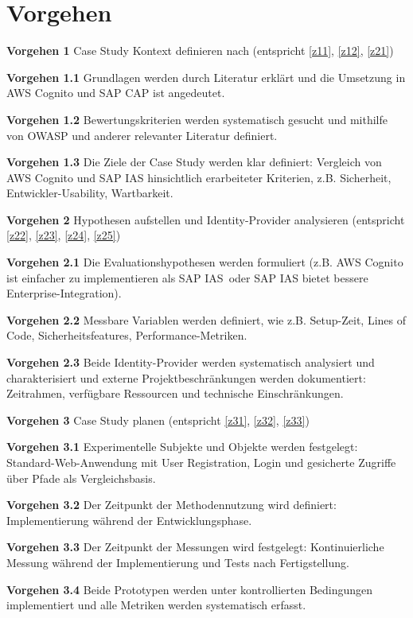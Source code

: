 \section{Vorgehen}

\begin{description}
    \item \textbf{Vorgehen 1} Case Study Kontext definieren nach \citep{Kitchenham1995} (entspricht \ref{z11}, \ref{z12}, \ref{z21})
        \item \textbf{Vorgehen 1.1} Grundlagen werden durch Literatur erklärt und die Umsetzung in AWS Cognito und \ac{SAP CAP} ist angedeutet.
        \item \textbf{Vorgehen 1.2} Bewertungskriterien werden systematisch gesucht und mithilfe von \ac{OWASP} und anderer relevanter Literatur definiert.
        \item \textbf{Vorgehen 1.3} Die Ziele der Case Study werden klar definiert: Vergleich von AWS Cognito und \ac{SAP IAS} hinsichtlich erarbeiteter Kriterien, z.B. Sicherheit, Entwickler-Usability, Wartbarkeit.
    
    \item \textbf{Vorgehen 2} Hypothesen aufstellen und Identity-Provider analysieren (entspricht \ref{z22}, \ref{z23}, \ref{z24}, \ref{z25})
        \item \textbf{Vorgehen 2.1} Die Evaluationshypothesen werden formuliert (z.B. \glqq AWS Cognito ist einfacher zu implementieren als SAP IAS\grqq\
         oder \glqq SAP IAS bietet bessere Enterprise-Integration\grqq).
        \item \textbf{Vorgehen 2.2} Messbare Variablen werden definiert, wie z.B. Setup-Zeit, Lines of Code, Sicherheitsfeatures, Performance-Metriken.
        \item \textbf{Vorgehen 2.3} Beide Identity-Provider werden systematisch analysiert und charakterisiert und externe Projektbeschränkungen werden dokumentiert: Zeitrahmen, verfügbare Ressourcen und technische Einschränkungen.
    
    \item \textbf{Vorgehen 3} Case Study planen (entspricht \ref{z31}, \ref{z32}, \ref{z33})
        \item \textbf{Vorgehen 3.1} Experimentelle Subjekte und Objekte werden festgelegt: Standard-Web-Anwendung mit User Registration, Login und gesicherte Zugriffe über Pfade als Vergleichsbasis.
        \item \textbf{Vorgehen 3.2} Der Zeitpunkt der Methodennutzung wird definiert: Implementierung während der Entwicklungsphase.
        \item \textbf{Vorgehen 3.3} Der Zeitpunkt der Messungen wird festgelegt: Kontinuierliche Messung während der Implementierung und Tests nach Fertigstellung.
        \item \textbf{Vorgehen 3.4} Beide Prototypen werden unter kontrollierten Bedingungen implementiert und alle Metriken werden systematisch erfasst.
    

\end{description}
